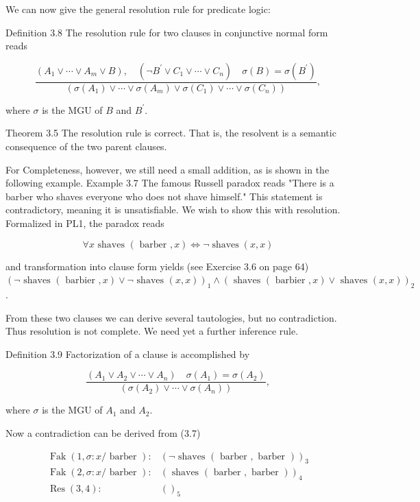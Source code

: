 \documentclass[10pt]{book}
\begin{document}
We can now give the general resolution rule for predicate logic:

Definition 3.8 The resolution rule for two clauses in conjunctive normal form reads

\begin{equation*}
\frac{\left(A_{1} \vee \cdots \vee A_{m} \vee B\right), \quad\left(\neg B^{\prime} \vee C_{1} \vee \cdots \vee C_{n}\right) \quad \sigma(B)=\sigma\left(B^{\prime}\right)}{\left(\sigma\left(A_{1}\right) \vee \cdots \vee \sigma\left(A_{m}\right) \vee \sigma\left(C_{1}\right) \vee \cdots \vee \sigma\left(C_{n}\right)\right)}, \tag{3.6}
\end{equation*}

where $\sigma$ is the MGU of $B$ and $B^{\prime}$.

Theorem 3.5 The resolution rule is correct. That is, the resolvent is a semantic consequence of the two parent clauses.

For Completeness, however, we still need a small addition, as is shown in the following example.
Example 3.7 The famous Russell paradox reads "There is a barber who shaves everyone who does not shave himself." This statement is contradictory, meaning it is unsatisfiable. We wish to show this with resolution. Formalized in PL1, the paradox reads

$$
\forall x \text { shaves }(\text { barber }, x) \Leftrightarrow \neg \operatorname{shaves}(x, x)
$$

and transformation into clause form yields (see Exercise 3.6 on page 64)\\
$(\neg \text { shaves }(\text { barbier }, x) \vee \neg \text { shaves }(x, x))_{1} \wedge(\text { shaves }(\text { barbier }, x) \vee \text { shaves }(x, x))_{2}$.

From these two clauses we can derive several tautologies, but no contradiction. Thus resolution is not complete. We need yet a further inference rule.

Definition 3.9 Factorization of a clause is accomplished by

$$
\frac{\left(A_{1} \vee A_{2} \vee \cdots \vee A_{n}\right) \quad \sigma\left(A_{1}\right)=\sigma\left(A_{2}\right)}{\left(\sigma\left(A_{2}\right) \vee \cdots \vee \sigma\left(A_{n}\right)\right)},
$$

where $\sigma$ is the MGU of $A_{1}$ and $A_{2}$.

Now a contradiction can be derived from (3.7)

$$
\begin{aligned}
\operatorname{Fak}(1, \sigma: x / \text { barber }): & (\neg \text { shaves }(\text { barber }, \text { barber }))_{3} \\
\operatorname{Fak}(2, \sigma: x / \text { barber }): & (\text { shaves }(\text { barber }, \text { barber }))_{4} \\
\operatorname{Res}(3,4): & ()_{5}
\end{aligned}
$$
\end{document}
